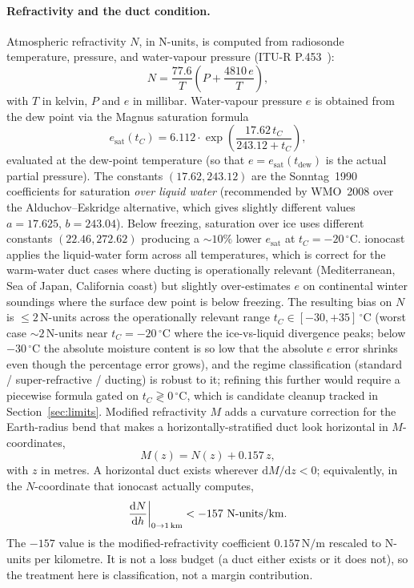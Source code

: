 \documentclass[11pt,a4paper]{article}
\newcommand{\SI}[2]{#1\,\text{#2}}
\newcommand{\si}[1]{\text{#1}}
\newcommand{\km}{\text{km}}
\newcommand{\degree}{\ensuremath{{}^\circ}}
\begin{document}
\paragraph{Refractivity and the duct condition.} Atmospheric
refractivity $N$, in N-units, is computed from radiosonde
temperature, pressure, and water-vapour pressure
(ITU-R P.453~\cite{itup453}):
\begin{equation}\label{eq:refractivity}
  N = \frac{77.6}{T} \left( P + \frac{4810\,e}{T} \right),
\end{equation}
with $T$ in kelvin, $P$ and $e$ in millibar. Water-vapour pressure
$e$ is obtained from the dew point via the Magnus saturation
formula
\begin{equation}\label{eq:esat}
  e_{\text{sat}}(t_C) = 6.112 \cdot
    \exp\!\left(\frac{17.62\,t_C}{243.12 + t_C}\right),
\end{equation}
evaluated at the dew-point temperature (so that
$e = e_{\text{sat}}(t_{\text{dew}})$ is the actual partial
pressure).  The constants $(17.62, 243.12)$ are the
Sonntag~1990~\cite{sonntag1990} coefficients for saturation
\emph{over liquid water} (recommended by WMO~2008 over the
Alduchov--Eskridge alternative, which gives slightly different
values $a=17.625$, $b=243.04$).  Below freezing, saturation over
ice uses different
constants $(22.46, 272.62)$ producing a ${\sim}10\%$ lower
$e_{\text{sat}}$ at $t_C = -20\,\degree\text{C}$.  ionocast applies
the liquid-water form across all temperatures, which is correct
for the warm-water duct cases where ducting is operationally
relevant (Mediterranean, Sea of Japan, California coast) but
slightly over-estimates $e$ on continental winter soundings where
the surface dew point is below freezing.  The resulting bias on
$N$ is ${\le}\!2$\,N-units across the operationally relevant range
$t_C \in [-30, +35]\,\degree\text{C}$ (worst case
${\sim}\!2$\,N-units near $t_C = -20\,\degree\text{C}$ where the
ice-vs-liquid divergence peaks; below $-30\,\degree\text{C}$ the
absolute moisture content is so low that the absolute $e$ error
shrinks even though the percentage error grows), and the regime
classification (standard / super-refractive / ducting) is robust
to it; refining this further would require a piecewise formula
gated on $t_C \gtrless 0\,\degree\text{C}$, which is candidate
cleanup tracked in Section~\ref{sec:limits}.  Modified refractivity $M$ adds a curvature correction
for the Earth-radius bend that makes a horizontally-stratified
duct look horizontal in $M$-coordinates,
\begin{equation}\label{eq:modM}
  M(z) = N(z) + 0.157\,z,
\end{equation}
with $z$ in metres.  A horizontal duct exists wherever
$\mathrm{d}M/\mathrm{d}z < 0$; equivalently, in the $N$-coordinate
that ionocast actually computes,
\begin{equation}\label{eq:ductthreshold}
  \frac{\mathrm{d}N}{\mathrm{d}h}\bigg|_{0\to\SI{1}{\km}}
    < -157~\text{N-units}/\si{\km}.
\end{equation}
The $-157$ value is the modified-refractivity coefficient
$0.157\,\text{N/m}$ rescaled to N-units per kilometre. It is not a
loss budget (a duct either exists or it does not), so the
treatment here is classification, not a margin contribution.
\end{document}
